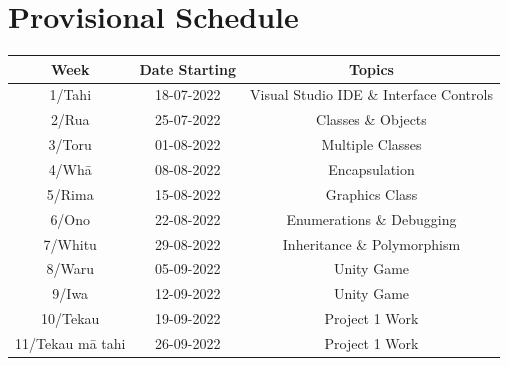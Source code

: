 \documentclass{article}
\begin{document}
\section*{Provisional Schedule}
\renewcommand{\arraystretch}{1.5}
\begin{tabular}{|c|c|c|c|}
	\hline
	\textbf{Week}                  & \textbf{Date Starting}            & \multicolumn{2}{c|}{\textbf{Topics}}                                                                                             \\ \hline
	\footnotesize 1/Tahi           & \footnotesize 18-07-2022 & \multicolumn{2}{c|}{\footnotesize Visual Studio IDE \& Interface Controls}    \\ \hline
	\footnotesize 2/Rua            & \footnotesize 25-07-2022 & \multicolumn{2}{c|}{\footnotesize Classes \& Objects}                   \\ \hline
	\footnotesize 3/Toru           & \footnotesize 01-08-2022 & \multicolumn{2}{c|}{\footnotesize Multiple Classes} \\ \hline
	\footnotesize 4/Whā            & \footnotesize 08-08-2022 & \multicolumn{2}{c|}{\footnotesize Encapsulation}                               \\ \hline
	\footnotesize 5/Rima           & \footnotesize 15-08-2022 & \multicolumn{2}{c|}{\footnotesize Graphics Class}                                                \\ \hline
	\footnotesize 6/Ono            & \footnotesize 22-08-2022 &  \multicolumn{2}{c|}{\footnotesize Enumerations \& Debugging}                            \\ \hline
	\footnotesize 7/Whitu          & \footnotesize 29-08-2022 & \multicolumn{2}{c|}{\footnotesize Inheritance \& Polymorphism}                                                   \\ \hline
	\footnotesize 8/Waru           & \footnotesize 05-09-2022 & \multicolumn{2}{c|}{\footnotesize Unity Game}                                                   \\ \hline
	\footnotesize 9/Iwa            & \footnotesize 12-09-2022 & \multicolumn{2}{c|}{\footnotesize  Unity Game }                                                                 \\ \hline
	\footnotesize 10/Tekau         & \footnotesize 19-09-2022 & \multicolumn{2}{c|}{\footnotesize Project 1 Work}                                                                 \\ \hline
	\footnotesize 11/Tekau mā tahi & \footnotesize 26-09-2022 & \multicolumn{2}{c|}{\footnotesize Project 1 Work}                                                                 \\ \hline

\end{tabular}
\end{document}
